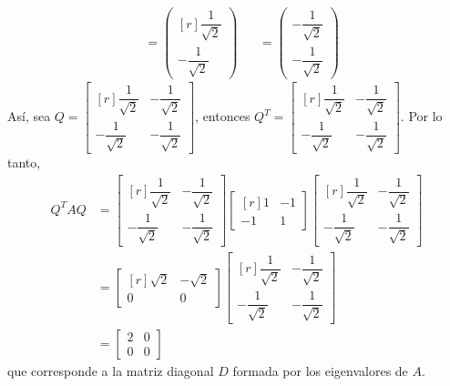 \begin{example}
\begin{align*}
        & = \begin{pmatrix*}[r]
            \dfrac{1}{\sqrt{2}} \\[3mm]
            -\dfrac{1}{\sqrt{2}}
        \end{pmatrix*} & & = \begin{pmatrix}
            -\dfrac{1}{\sqrt{2}} \\[3mm]
            -\dfrac{1}{\sqrt{2}}
        \end{pmatrix}
    \end{align*}
    Así, sea $Q = \begin{bmatrix*}[r]
        \dfrac{1}{\sqrt{2}} & -\dfrac{1}{\sqrt{2}} \\[3mm]
        -\dfrac{1}{\sqrt{2}} & -\dfrac{1}{\sqrt{2}}
    \end{bmatrix*}$, entonces $Q^T = \begin{bmatrix*}[r]
        \dfrac{1}{\sqrt{2}} & - \dfrac{1}{\sqrt{2}} \\[3mm]
        -\dfrac{1}{\sqrt{2}} & -\dfrac{1}{\sqrt{2}}
    \end{bmatrix*}$. Por lo tanto,
    \begin{align*}
        Q^TAQ & = \begin{bmatrix*}[r]
            \dfrac{1}{\sqrt{2}} & - \dfrac{1}{\sqrt{2}} \\[3mm]
            -\dfrac{1}{\sqrt{2}} & -\dfrac{1}{\sqrt{2}}
        \end{bmatrix*} \begin{bmatrix*}[r]
            1 & -1 \\
            -1 & 1
        \end{bmatrix*} \begin{bmatrix*}[r]
            \dfrac{1}{\sqrt{2}} & -\dfrac{1}{\sqrt{2}} \\[3mm]
            -\dfrac{1}{\sqrt{2}} & -\dfrac{1}{\sqrt{2}}
        \end{bmatrix*} \\
        & = \begin{bmatrix*}[r]
            \sqrt{2} & -\sqrt{2} \\
            0 & 0
        \end{bmatrix*} \begin{bmatrix*}[r]
            \dfrac{1}{\sqrt{2}} & -\dfrac{1}{\sqrt{2}} \\[3mm]
            -\dfrac{1}{\sqrt{2}} & -\dfrac{1}{\sqrt{2}}
        \end{bmatrix*} \\
        & = \begin{bmatrix}
            2 & 0 \\
            0 & 0
        \end{bmatrix}
    \end{align*}
    que corresponde a la matriz diagonal $D$ formada por los eigenvalores de $A$.
\end{example}

